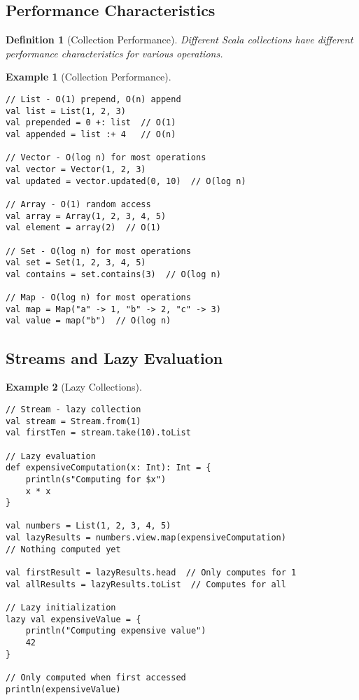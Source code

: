 \documentclass[11pt]{article}
\newtheorem{definition}{Definition}[section]
\newtheorem{example}{Example}[section]
\begin{document}
\subsection{Performance Characteristics}

\begin{definition}[Collection Performance]
Different Scala collections have different performance characteristics for various operations.
\end{definition}

\begin{example}[Collection Performance]
\begin{lstlisting}
// List - O(1) prepend, O(n) append
val list = List(1, 2, 3)
val prepended = 0 +: list  // O(1)
val appended = list :+ 4   // O(n)

// Vector - O(log n) for most operations
val vector = Vector(1, 2, 3)
val updated = vector.updated(0, 10)  // O(log n)

// Array - O(1) random access
val array = Array(1, 2, 3, 4, 5)
val element = array(2)  // O(1)

// Set - O(log n) for most operations
val set = Set(1, 2, 3, 4, 5)
val contains = set.contains(3)  // O(log n)

// Map - O(log n) for most operations
val map = Map("a" -> 1, "b" -> 2, "c" -> 3)
val value = map("b")  // O(log n)
\end{lstlisting}
\end{example}

\subsection{Streams and Lazy Evaluation}

\begin{example}[Lazy Collections]
\begin{lstlisting}
// Stream - lazy collection
val stream = Stream.from(1)
val firstTen = stream.take(10).toList

// Lazy evaluation
def expensiveComputation(x: Int): Int = {
    println(s"Computing for $x")
    x * x
}

val numbers = List(1, 2, 3, 4, 5)
val lazyResults = numbers.view.map(expensiveComputation)
// Nothing computed yet

val firstResult = lazyResults.head  // Only computes for 1
val allResults = lazyResults.toList  // Computes for all

// Lazy initialization
lazy val expensiveValue = {
    println("Computing expensive value")
    42
}

// Only computed when first accessed
println(expensiveValue)
\end{lstlisting}
\end{example}
\end{document}
